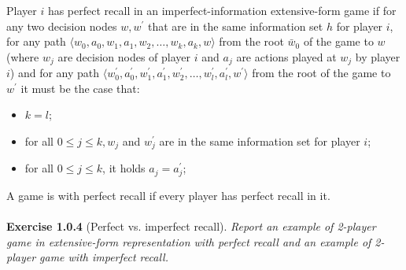 Player $i$ has perfect recall in an imperfect-information extensive-form game if for any two decision nodes $ w, w^{\prime} $ that are in the same information set $h$ for player $i$, for any path $ \langle w_{0}, a_{0}, w_{1}, a_{1}, w_{2}, \ldots, w_{k}, a_{k}, w \rangle $ from the root $\bar{w}_{0}$ of the game to $w$ (where $w_{j}$ are decision nodes of player $i$ and $a_{j}$ are actions played at $w_{j}$ by player $i$) and for any path $ \langle w_{0}^{\prime}, a_{0}^{\prime}, w_{1}^{\prime}, a_{1}^{\prime}, w_{2}^{\prime}, \ldots, w_{l}^{\prime}, a_{l}^{\prime}, w^{\prime} \rangle $ from the root of
the game to $ w^{\prime} $ it must be the case that:
\begin{itemize}
\item $ k = l $;
\item for all $ 0 \leqslant j \leqslant k, w_{j} $ and $ w_{j}^{\prime} $ are in the same information set for player $i$;
\item for all $ 0 \leqslant j \leqslant k $, it holds $ a_{j}=a_{j}^{\prime} $;
\end{itemize}
A game is with perfect recall if every player has perfect recall in it.\\\\
\textbf{Exercise 1.0.4} (Perfect vs. imperfect recall). \textit{Report an example of 2-player game in extensive-form representation
with perfect recall and an example of 2-player game with imperfect recall.}
